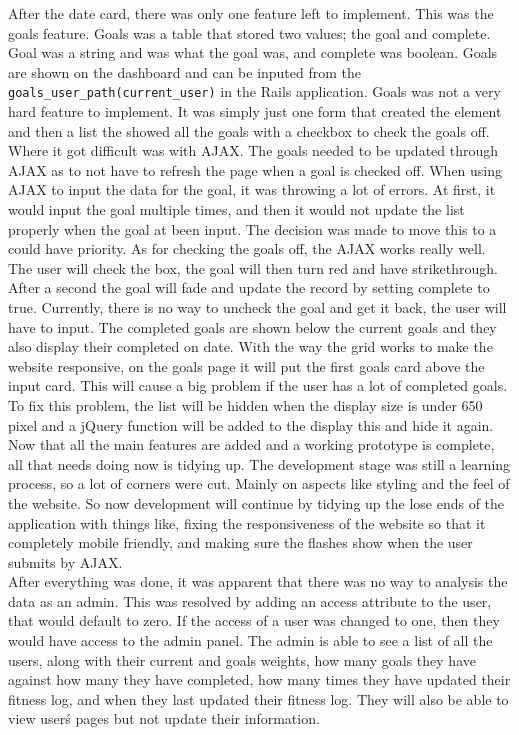 After the date card, there was only one feature left to implement. This was the goals feature. Goals was a table that stored two values; the goal and complete. Goal was a string and was what the goal was, and complete was boolean. Goals are shown on the dashboard and can be inputed from the \lstinline{goals_user_path(current_user)} in the Rails application. Goals was not a very hard feature to implement. It was simply just one form that created the element and then a list the showed all the goals with a checkbox to check the goals off. Where it got difficult was with AJAX. The goals needed to be updated through AJAX as to not have to refresh the page when a goal is checked off. When using AJAX to input the data for the goal, it was throwing a lot of errors. At first, it would input the goal multiple times, and then it would not update the list properly when the goal at been input. The decision was made to move this to a could have priority. As for checking the goals off, the AJAX works really well. The user will check the box, the goal will then turn red and have strikethrough. After a second the goal will fade and update the record by setting complete to true. Currently, there is no way to uncheck the goal and get it back, the user will have to input. The completed goals are shown below the current goals and they also display their completed on date. With the way the grid works to make the website responsive, on the goals page it will put the first goals card above the input card. This will cause a big problem if the user has a lot of completed goals. To fix this problem, the list will be hidden when the display size is under 650 pixel and a jQuery function will be added to the display this and hide it again.\\

Now that all the main features are added and a working prototype is complete, all that needs doing now is tidying up. The development stage was still a learning process, so a lot of corners were cut. Mainly on aspects like styling and the feel of the website. So now development will continue by tidying up the lose ends of the application with things like, fixing the responsiveness of the website so that it completely mobile friendly, and making sure the flashes show when the user submits by AJAX.\\

After everything was done, it was apparent that there was no way to analysis the data as an admin. This was resolved by adding an access attribute to the user, that would default to zero. If the access of a user was changed to one, then they would have access to the admin panel. The admin is able to see a list of all the users, along with their current and goals weights, how many goals they have against how many they have completed, how many times they have updated their fitness log, and when they last updated their fitness log. They will also be able to view user\'s pages but not update their information. \\

